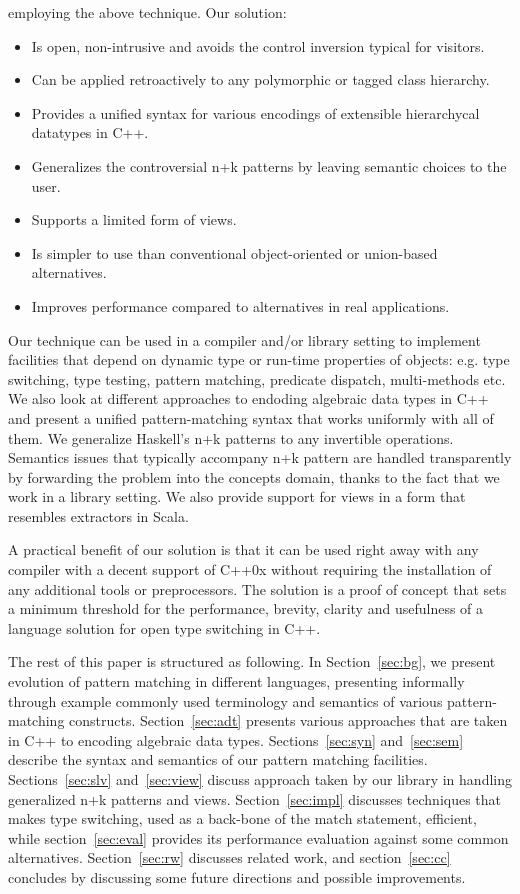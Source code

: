 \documentclass[preprint]{sigplanconf}
\begin{document}
\begin{itemize}
      employing the above technique. Our solution:
  \begin{itemize}
  \item Is open, non-intrusive and avoids the control inversion typical for visitors.
  \item Can be applied retroactively to any polymorphic or tagged class hierarchy.
  \item Provides a unified syntax for various encodings of extensible 
        hierarchycal datatypes in C++.
  \item Generalizes the controversial n+k patterns by leaving semantic choices to the user.
  \item Supports a limited form of views.
  \item Is simpler to use than conventional object-oriented or union-based alternatives.
  \item Improves performance compared to alternatives in real applications.
  \end{itemize}
\end{itemize}

\noindent
Our technique can be used in a compiler and/or library setting to implement 
facilities that depend on dynamic type or run-time properties of objects: e.g. 
type switching, type testing, pattern matching, predicate dispatch, 
multi-methods etc. We also look at different approaches to endoding algebraic 
data types in C++ and present a unified pattern-matching syntax that works 
uniformly with all of them. 
We generalize Haskell's n+k patterns\cite{haskell98} to any invertible operations. 
Semantics issues that typically accompany n+k pattern are handled transparently 
by forwarding the problem into the concepts domain, thanks to the fact that we 
work in a library setting. We also provide support for views in a form that 
resembles extractors in Scala. 

A practical benefit of our solution is that it can be used right away with any 
compiler with a decent support of C++0x without requiring the installation of 
any additional tools or preprocessors. The solution is a proof of concept that 
sets a minimum threshold for the performance, brevity, clarity and usefulness of 
a language solution for open type switching in C++.

The rest of this paper is structured as following. In Section~\ref{sec:bg}, we 
present evolution of pattern matching in different languages, presenting 
informally through example commonly used terminology and semantics of various 
pattern-matching constructs. Section~\ref{sec:adt} presents various approaches 
that are taken in C++ to encoding algebraic data types.
Sections~\ref{sec:syn} and~\ref{sec:sem} describe the syntax and semantics of 
our pattern matching facilities. Sections~\ref{sec:slv} and~\ref{sec:view} discuss 
approach taken by our library in handling generalized n+k patterns and views. 
Section~\ref{sec:impl} discusses techniques that makes type switching, used as a 
back-bone of the match statement, efficient, while section~\ref{sec:eval} 
provides its performance evaluation against some common alternatives. 
Section~\ref{sec:rw} discusses related work, and section~\ref{sec:cc} concludes 
by discussing some future directions and possible improvements.
\end{document}
